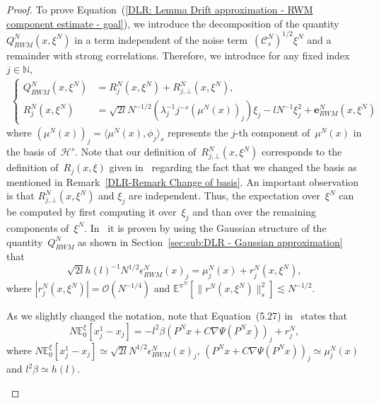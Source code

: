 \begin{proof}
 To prove Equation~(\ref{DLR: Lemma Drift approximation - RWM component estimate - goal}), we introduce the decomposition of the quantity~$ Q^N_{RWM}(x, \xi^N)$ in a term independent of the noise term~$ (\mathcal{C}_s^N)^{1/2} \xi^N$ and a remainder with strong correlations. Therefore, we introduce for any fixed index~$j \in \mathbb{N}$, 
 \begin{equation}
   \label{DLR : Lemma Drift approximation - Decomposition Q RWM}
   \begin{split}
     \begin{cases}
          Q^N_{RWM}(x, \xi^N) & = R^N_j (x, \xi^N) + R^N_{j, \bot}(x, \xi^N), \\
	  R^N_j (x, \xi^N) & = \sqrt{2l} N^{-1/2} (\lambda_j^{-1} j^{-s} (\mu^N(x))_j) \xi_j - l N^{-1} \xi_j^2 + \textbf{e}^N_{RWM}(x, \xi^N)
     \end{cases}
   \end{split}
 \end{equation}
 where $(\mu^N(x))_j = \langle \mu^N(x), \phi_j \rangle_s$ represents the $j$-th component of~$\mu^N(x)$ in the basis of~$\mathcal{H}^s$. Note that our definition of~$R^N_{j, \bot}(x, \xi^N)$ corresponds to the definition of~$R_j(x, \xi)$ given in~\autocite[Chapter 2.6]{Mattingly2010} regarding the fact that we changed the basis as mentioned in Remark~\ref{DLR-Remark Change of basis}. An important observation is that $R^N_{j, \bot}(x, \xi^N)$ and $\xi_j$ are independent. Thus, the expectation over~$\xi^N$ can be computed by first computing it over~$\xi_j$ and than over the remaining components of~$\xi^N$. In~\autocite[Lemma 5.5 - 11]{Mattingly2010} it is proven by using  the Gaussian structure of the quantity~$Q^N_{RWM}$ as shown in Section~\ref{sec:sub:DLR - Gaussian approximation} that
 \begin{equation}
    \sqrt{2l} h(l)^{-1} N^{1/2}  \epsilon_{RWM}^N (x)_j =  \mu^N_j(x) +  r^N_j(x, \xi^N),
 \end{equation}
 where $ |r^N_j(x, \xi^N)| = \mathcal{O}(N^{-1/4})$ and $ \mathbb{E}^{\pi^N}[ \|  r^N(x, \xi^N)\|_s^2] \lesssim N^{-1/2}$. 
 \begin{rem}
  As we slightly changed the notation, note that Equation~(5.27) in~\autocite{Mattingly2010} states that
 \begin{equation*}
   N \mathbb{E}_0^{\xi}[x_j^1 - x_j] = - l^2 \beta (P^N x + C \nabla \Psi(P^Nx))_j + r_j^N,
 \end{equation*}
 where $N \mathbb{E}_0^{\xi}[x_j^1 - x_j] \simeq \sqrt{2l} N^{1/2} \epsilon_{RWM}^N (x)_j$,  $(P^N x + C \nabla \Psi(P^Nx))_j \simeq \mu^N_j(x)$ and $l^2 \beta \simeq h(l)$.

\end{rem}
\end{proof}
